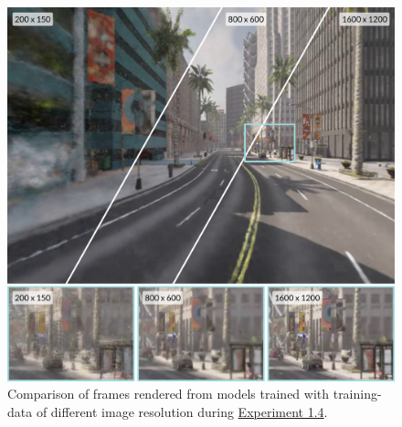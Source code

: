 \begin{figure}[ht]
    \centering
    \includegraphics[width=1.0\textwidth]{figures/image-size-comparison-details.png}
    \caption{Comparison of frames rendered from models trained with training-data of different image resolution during \hyperref[sec:exp-image-resolution]{Experiment 1.4}.}
    \label{fig:image-size-comparison}
\end{figure}